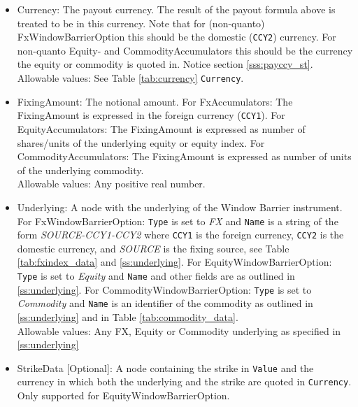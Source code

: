 \begin{itemize}

\item Currency: The payout currency. The result of the payout formula above is treated to be in this currency. Note that
  for (non-quanto) FxWindowBarrierOption this should be the domestic (\lstinline!CCY2!) currency. For non-quanto Equity-
  and CommodityAccumulators this should be the currency the equity or commodity is quoted in. Notice section
  \ref{sss:payccy_st}. \\

Allowable values: See Table \ref{tab:currency} \lstinline!Currency!.

\item FixingAmount: The notional amount. For FxAccumulators: The FixingAmount is expressed in the foreign currency
  (\lstinline!CCY1!).  For EquityAccumulators: The FixingAmount is expressed as number of shares/units of the underlying
  equity or equity index. For CommodityAccumulators: The FixingAmount is expressed as number of units of the underlying
  commodity. \\

Allowable values: Any positive real number.

\item Underlying: A node with the underlying of the Window Barrier instrument. For FxWindowBarrierOption:
  \lstinline!Type! is set to \emph{FX} and \lstinline!Name! is a string of the form \emph{SOURCE-CCY1-CCY2} where
  \lstinline!CCY1! is the foreign currency, \lstinline!CCY2! is the domestic currency, and \emph{SOURCE} is the fixing
  source, see Table \ref{tab:fxindex_data} and \ref{ss:underlying}. For EquityWindowBarrierOption: \lstinline!Type! is
  set to \emph{Equity} and \lstinline!Name! and other fields are as outlined in \ref{ss:underlying}. For
  CommodityWindowBarrierOption: \lstinline!Type! is set to \emph{Commodity} and \lstinline!Name! is an identifier of the
  commodity as outlined in \ref{ss:underlying} and in Table \ref{tab:commodity_data}.\\

Allowable values: Any FX, Equity or Commodity underlying as specified in \ref{ss:underlying}

\item StrikeData [Optional]: A node containing the strike in \lstinline!Value! and the currency in which both the
  underlying and the strike are quoted in \lstinline!Currency!. Only supported for EquityWindowBarrierOption.\\


\end{itemize}
